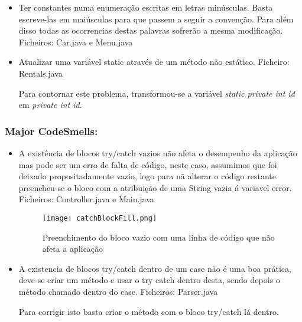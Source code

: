 \begin{itemize}
\item Ter constantes numa enumeração escritas em letras minúsculas. Basta escreve-las em maiúsculas para que passem a seguir a convenção. Para além disso todas as ocorrencias destas palavras sofrerão a mesma modificação.
 Ficheiros: Car.java e Menu.java\newline
\end{itemize}

\begin{itemize}
\item Atualizar uma variável static através de um método não estático.\newline
 Ficheiro: Rentals.java\newline
\par Para contornar este problema, transformou-se a variável \textit{static private int id} em \textit{private int id}.
\end{itemize}




\subsubsection{Major CodeSmells:}

\begin{itemize}
\item A existência de blocos try/catch vazios não afeta o desempenho da aplicação mas pode ser um erro de falta de código, neste caso, assumimos que foi deixado propositadamente vazio, logo para nã alterar o código restante preencheu-se o bloco com a atribuição de uma String vazia á variavel error.\newline
 Ficheiros: Controller.java e Main.java\newline

 \begin{figure}[H]

  \centering

  \texttt{[image: catchBlockFill.png]}

  \caption {Preenchimento do bloco vazio com uma linha de código que não afeta a aplicação}

  \label {fig11}

\end{figure}
\end{itemize}

\begin{itemize}
\item A existencia de blocos try/catch dentro de um case não é uma boa prática, deve-se criar um método e usar o try catch dentro desta, sendo depois o método chamado dentro do case.\newline
 Ficheiros: Parser.java\newline
\par Para corrigir isto basta criar o método com o bloco try/catch lá dentro.
\end{itemize}

